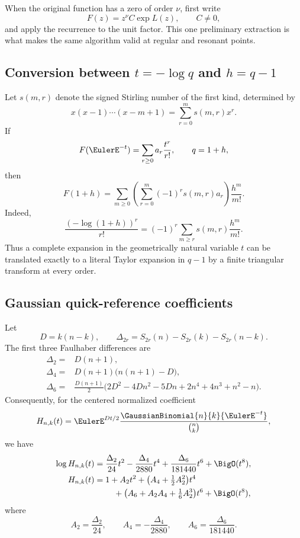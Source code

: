 \documentclass[11pt,oneside]{article}
\theoremstyle{definition}
\theoremstyle{remark}
\let\reportsubsection\subsection
\let\section\reportsubsection
\begin{document}
When the original function has a zero of order $\nu$, first write
\[
 F(z)=z^\nu C\exp L(z),\qquad C\ne0,
\]
and apply the recurrence to the unit factor.  This one preliminary extraction
is what makes the same algorithm valid at regular and resonant points.

\section{Conversion between \texorpdfstring{$t=-\log q$}{t = -log q} and \texorpdfstring{$h=q-1$}{h = q - 1}}

Let $s(m,r)$ denote the signed Stirling number of the first kind, determined by
\[
 x(x-1)\cdots(x-m+1)=\sum_{r=0}^{m}s(m,r)x^r.
\]
If
\[
 F(\EulerE^{-t})=\sum_{r\ge0}a_r\frac{t^r}{r!},
 \qquad q=1+h,
\]
then
\begin{equation}\label{eq:t-to-h-stirling}
 F(1+h)=\sum_{m\ge0}
 \left(\sum_{r=0}^{m}(-1)^r s(m,r)a_r\right)\frac{h^m}{m!}.
\end{equation}
Indeed,
\[
 \frac{(-\log(1+h))^r}{r!}
 =(-1)^r\sum_{m\ge r}s(m,r)\frac{h^m}{m!}.
\]
Thus a complete expansion in the geometrically natural variable $t$ can be
translated exactly to a literal Taylor expansion in $q-1$ by a finite
triangular transform at every order.

\section{Gaussian quick-reference coefficients}

Let
\[
 D=k(n-k),\qquad
 \Delta_{2r}=S_{2r}(n)-S_{2r}(k)-S_{2r}(n-k).
\]
The first three Faulhaber differences are
\begin{align*}
 \Delta_2={}&D(n+1),\\
 \Delta_4={}&D(n+1)\bigl(n(n+1)-D\bigr),\\
 \Delta_6={}&\frac{D(n+1)}2
 \bigl(2D^2-4Dn^2-5Dn+2n^4+4n^3+n^2-n\bigr).
\end{align*}
Consequently, for the centered normalized coefficient
\[
 H_{n,k}(t)=
 \EulerE^{Dt/2}\frac{\GaussianBinomial{n}{k}{\EulerE^{-t}}}{\binom nk},
\]
we have
\begin{align*}
 \log H_{n,k}(t)
 ={}&\frac{\Delta_2}{24}t^2
     -\frac{\Delta_4}{2880}t^4
     +\frac{\Delta_6}{181440}t^6+\BigO(t^8),\\
 H_{n,k}(t)
 ={}&1+A_2t^2+\bigl(A_4+\tfrac12A_2^2\bigr)t^4\\
 &\quad+\bigl(A_6+A_2A_4+\tfrac16A_2^3\bigr)t^6+\BigO(t^8),
\end{align*}
where
\[
 A_2=\frac{\Delta_2}{24},\qquad
 A_4=-\frac{\Delta_4}{2880},\qquad
 A_6=\frac{\Delta_6}{181440}.
\]
\end{document}
